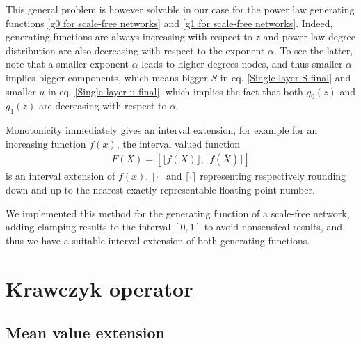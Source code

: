 \documentclass[
11pt, %
american, %
singlespacing, %
final, %
nolistspacing, %
liststotoc, %
headsepline, %
]{MastersDoctoralThesis} %
\begin{document}
This general problem is however solvable in our case for the power law generating functions \eqref{g0 for scale-free networks} and \eqref{g1 for scale-free networks}. Indeed, generating functions are always increasing with respect to $z$ and power law degree distribution are also decreasing with respect to the exponent $\alpha$. To see the latter, note that a smaller exponent $\alpha$ leads to higher degrees nodes, and thus smaller $\alpha$ implies bigger components, which means bigger $S$ in eq. \eqref{Single layer S final} and smaller $u$ in eq. \eqref{Single layer u final}, which implies the fact that both $g_0(z)$ and $g_1(z)$ are decreasing with respect to $\alpha$.

Monotonicity immediately gives an interval extension, for example for an increasing function $f(x)$, the interval valued function
\begin{align}
	F(X) = \left[\lfloor f(\underline{X}) \rfloor, \lceil f(\overline{X}) \rceil \right]
\end{align}
is an interval extension of $f(x)$, $\lfloor \cdot \rfloor$ and $\lceil \cdot \rceil$ representing respectively rounding down and up to the nearest exactly representable floating point number.

We implemented this method for the generating function of a scale-free network, adding clamping results to the interval $[0, 1]$ to avoid nonsensical results, and thus we have a suitable interval extension of both generating functions.

\chapter{Krawczyk operator}
\label{Appendix: Krawczyk operator}

\section{Mean value extension}
\end{document}
